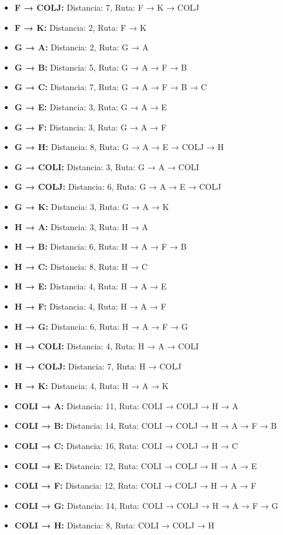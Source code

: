 \documentclass[12pt]{article}
\begin{document}
\begin{itemize}
\item \textbf{F → COLJ:} Distancia: 7, Ruta: F → K → COLJ
\item \textbf{F → K:} Distancia: 2, Ruta: F → K
\item \textbf{G → A:} Distancia: 2, Ruta: G → A
\item \textbf{G → B:} Distancia: 5, Ruta: G → A → F → B
\item \textbf{G → C:} Distancia: 7, Ruta: G → A → F → B → C
\item \textbf{G → E:} Distancia: 3, Ruta: G → A → E
\item \textbf{G → F:} Distancia: 3, Ruta: G → A → F
\item \textbf{G → H:} Distancia: 8, Ruta: G → A → E → COLJ → H
\item \textbf{G → COLI:} Distancia: 3, Ruta: G → A → COLI
\item \textbf{G → COLJ:} Distancia: 6, Ruta: G → A → E → COLJ
\item \textbf{G → K:} Distancia: 3, Ruta: G → A → K
\item \textbf{H → A:} Distancia: 3, Ruta: H → A
\item \textbf{H → B:} Distancia: 6, Ruta: H → A → F → B
\item \textbf{H → C:} Distancia: 8, Ruta: H → C
\item \textbf{H → E:} Distancia: 4, Ruta: H → A → E
\item \textbf{H → F:} Distancia: 4, Ruta: H → A → F
\item \textbf{H → G:} Distancia: 6, Ruta: H → A → F → G
\item \textbf{H → COLI:} Distancia: 4, Ruta: H → A → COLI
\item \textbf{H → COLJ:} Distancia: 7, Ruta: H → COLJ
\item \textbf{H → K:} Distancia: 4, Ruta: H → A → K
\item \textbf{COLI → A:} Distancia: 11, Ruta: COLI → COLJ → H → A
\item \textbf{COLI → B:} Distancia: 14, Ruta: COLI → COLJ → H → A → F → B
\item \textbf{COLI → C:} Distancia: 16, Ruta: COLI → COLJ → H → C
\item \textbf{COLI → E:} Distancia: 12, Ruta: COLI → COLJ → H → A → E
\item \textbf{COLI → F:} Distancia: 12, Ruta: COLI → COLJ → H → A → F
\item \textbf{COLI → G:} Distancia: 14, Ruta: COLI → COLJ → H → A → F → G
\item \textbf{COLI → H:} Distancia: 8, Ruta: COLI → COLJ → H

\end{itemize}
\end{document}
